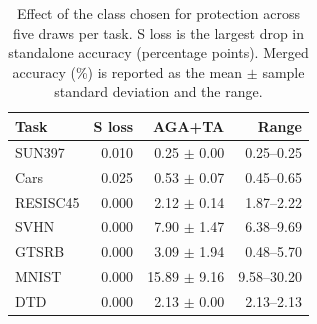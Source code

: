 \begin{table}[!htbp]
\centering
\small
\setlength{\tabcolsep}{3pt}
\caption{Effect of the class chosen for protection across five draws per task. S loss is the largest drop in standalone accuracy (percentage points). Merged accuracy (\%) is reported as the mean $\pm$ sample standard deviation and the range.}
\label{tab:class-stability}
\begin{tabular}{lrrr}
\toprule
Task & S loss & AGA+TA & Range \\
\midrule
SUN397 & 0.010 & 0.25 $\pm$ 0.00 & 0.25--0.25 \\
Cars & 0.025 & 0.53 $\pm$ 0.07 & 0.45--0.65 \\
RESISC45 & 0.000 & 2.12 $\pm$ 0.14 & 1.87--2.22 \\
SVHN & 0.000 & 7.90 $\pm$ 1.47 & 6.38--9.69 \\
GTSRB & 0.000 & 3.09 $\pm$ 1.94 & 0.48--5.70 \\
MNIST & 0.000 & 15.89 $\pm$ 9.16 & 9.58--30.20 \\
DTD & 0.000 & 2.13 $\pm$ 0.00 & 2.13--2.13 \\
\bottomrule
\end{tabular}
\end{table}
